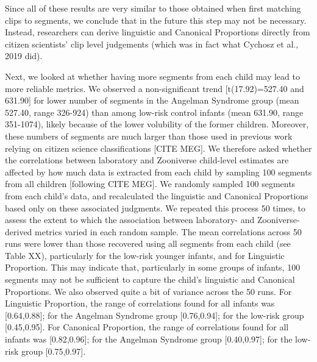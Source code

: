 \documentclass[english,,man,floatsintext]{apa6}
\begin{document}
Since all of these results are very similar to those obtained when first matching clips to segments, we conclude that in the future this step may not be necessary. Instead, researchers can derive linguistic and Canonical Proportions directly from citizen scientists' clip level judgements (which was in fact what Cychosz et al., 2019 did).

Next, we looked at whether having more segments from each child may lead to more reliable metrics. We observed a non-significant trend {[}t(17.92)=527.40 and 631.90{]} for lower number of segments in the Angelman Syndrome group (mean 527.40, range 326-924) than among low-risk control infants (mean 631.90, range 351-1074), likely because of the lower volubility of the former children. Moreover, these numbers of segments are much larger than those used in previous work relying on citizen science classifications {[}CITE MEG{]}. We therefore asked whether the correlations between laboratory and Zooniverse child-level estimates are affected by how much data is extracted from each child by sampling 100 segments from all children {[}following CITE MEG{]}. We randomly sampled 100 segments from each child's data, and recalculated the linguistic and Canonical Proportions based only on these associated judgments. We repeated this process 50 times, to assess the extent to which the association between laboratory- and Zooniverse-derived metrics varied in each random sample. The mean correlations across 50 runs were lower than those recovered using all segments from each child (see Table XX), particularly for the low-risk younger infants, and for Linguistic Proportion. This may indicate that, particularly in some groups of infants, 100 segments may not be sufficient to capture the child's linguistic and Canonical Proportions. We also observed quite a bit of variance across the 50 runs. For Linguistic Proportion, the range of correlations found for all infants was {[}0.64,0.88{]}; for the Angelman Syndrome group {[}0.76,0.94{]}; for the low-risk group {[}0.45,0.95{]}. For Canonical Proportion, the range of correlations found for all infants was {[}0.82,0.96{]}; for the Angelman Syndrome group {[}0.40,0.97{]}; for the low-risk group {[}0.75,0.97{]}.
\end{document}
